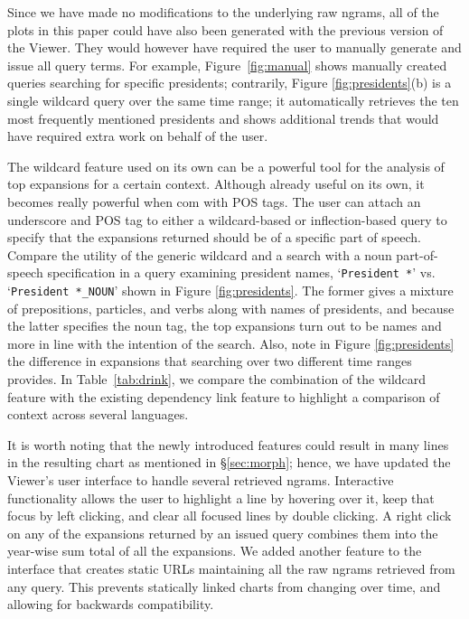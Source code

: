 \documentclass[11pt,a4paper]{article}
\newcommand{\query}[1]{\texttt{#1}}
\begin{document}
Since we have made no modifications to the underlying raw ngrams, all of the plots in this paper could have also been generated with the previous version of the Viewer. They would however have required the user to manually generate and issue all query terms. For example, Figure~\ref{fig:manual} shows manually created queries searching for specific presidents; contrarily, Figure \ref{fig:presidents}(b) is a single wildcard query over the same time range; it automatically retrieves the ten most frequently mentioned presidents and shows additional trends that would have required extra work on behalf of the user.

The wildcard feature used on its own can be a powerful tool for the analysis of top expansions for a certain context.  Although already useful on its own, it becomes really powerful when com with POS tags. The user can attach an underscore and POS tag to either a wildcard-based or inflection-based query to specify that the expansions returned should be of a specific part of speech. Compare the utility of the generic wildcard and a search with a noun part-of-speech specification in a query examining president names, `\query{President *}' vs. `\query{President *\_NOUN}' shown in Figure \ref{fig:presidents}. The former gives a mixture of prepositions, particles, and verbs along with names of presidents, and because the latter specifies the noun tag, the top expansions turn out to be names and more in line with the intention of the search. Also, note in Figure \ref{fig:presidents} the difference in expansions that searching over two different time ranges provides. In Table~\ref{tab:drink}, we compare the combination of the wildcard feature with the existing dependency link feature to highlight a comparison of context across several languages.

It is worth noting that the newly introduced features could result in many lines in the resulting chart as mentioned in \S\ref{sec:morph}; hence, we have updated the Viewer's user interface to handle several retrieved ngrams. Interactive functionality allows the user to highlight a line by hovering over it, keep that focus by left clicking, and clear all focused lines by double clicking. A right click on any of the expansions returned by an issued query combines them into the year-wise sum total of all the expansions. We added another feature to the interface that creates static URLs maintaining all the raw ngrams retrieved from any query. This prevents statically linked charts from changing over time, and allowing for backwards compatibility.
\end{document}

